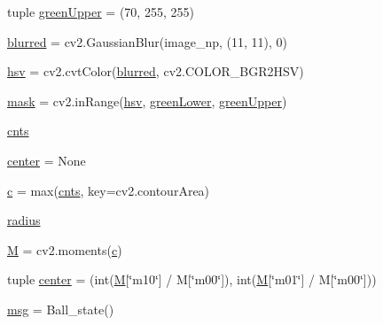 \begin{DoxyCompactItemize}
tuple \hyperlink{classballDetection_1_1image__feature_a0a37e51a267a8f2e81abbbad3c120122}{green\+Upper} = (70, 255, 255)
\item 
\hyperlink{classballDetection_1_1image__feature_a192f6fe52f2e6067fac63cf7af3bebda}{blurred} = cv2.\+Gaussian\+Blur(image\+\_\+np, (11, 11), 0)
\item 
\hyperlink{classballDetection_1_1image__feature_a86c8b7e7581075179dea815950abb95f}{hsv} = cv2.\+cvt\+Color(\hyperlink{classballDetection_1_1image__feature_a192f6fe52f2e6067fac63cf7af3bebda}{blurred}, cv2.\+C\+O\+L\+O\+R\+\_\+\+B\+G\+R2\+H\+SV)
\item 
\hyperlink{classballDetection_1_1image__feature_ad659708b5d3ba7904aa0d4330266d41c}{mask} = cv2.\+in\+Range(\hyperlink{classballDetection_1_1image__feature_a86c8b7e7581075179dea815950abb95f}{hsv}, \hyperlink{classballDetection_1_1image__feature_a2b1d1abdc4e93d6a6eba6ba40f5a3f77}{green\+Lower}, \hyperlink{classballDetection_1_1image__feature_a0a37e51a267a8f2e81abbbad3c120122}{green\+Upper})
\item 
\hyperlink{classballDetection_1_1image__feature_a13f936766fe3bbfe466d4bef773bb4f9}{cnts}
\item 
\hyperlink{classballDetection_1_1image__feature_a3b6a3451dbb6f3643346969ea9af3670}{center} = None
\item 
\hyperlink{classballDetection_1_1image__feature_a0ffd02f437ce41c517d2c870c059739b}{c} = max(\hyperlink{classballDetection_1_1image__feature_a13f936766fe3bbfe466d4bef773bb4f9}{cnts}, key=cv2.\+contour\+Area)
\item 
\hyperlink{classballDetection_1_1image__feature_a370e9015a86097812e323a9e18607c04}{radius}
\item 
\hyperlink{classballDetection_1_1image__feature_a45bb9e555b09541234f1724df7424e90}{M} = cv2.\+moments(\hyperlink{classballDetection_1_1image__feature_a0ffd02f437ce41c517d2c870c059739b}{c})
\item 
tuple \hyperlink{classballDetection_1_1image__feature_a7decaea2748c245d5940ea2f267a4cfc}{center} = (int(\hyperlink{classballDetection_1_1image__feature_a45bb9e555b09541234f1724df7424e90}{M}\mbox{[}\char`\"{}m10\char`\"{}\mbox{]} / M\mbox{[}\char`\"{}m00\char`\"{}\mbox{]}), int(\hyperlink{classballDetection_1_1image__feature_a45bb9e555b09541234f1724df7424e90}{M}\mbox{[}\char`\"{}m01\char`\"{}\mbox{]} / M\mbox{[}\char`\"{}m00\char`\"{}\mbox{]}))
\item 
\hyperlink{classballDetection_1_1image__feature_a3217e5c3695187fcf57a71915908e2fa}{msg} = Ball\+\_\+state()
\item 

\end{DoxyCompactItemize}
